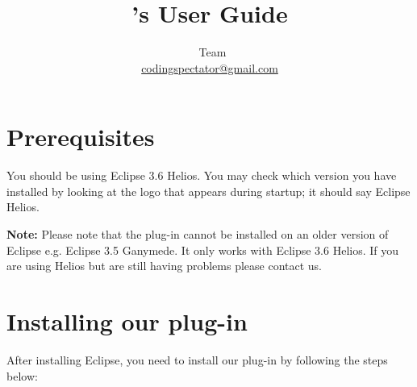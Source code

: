 \documentclass{article}
\title{\codspec's User Guide}
\author{\codspec\
Team\\\href{mailto:codingspectator@gmail.com}{codingspectator@gmail.com}}
\newcommand\warnnote[1]{\textbf{Note: }#1}
\begin{document}
%
\maketitle
%
\tableofcontents
%
\section{Prerequisites}
%
You should be using Eclipse 3.6 Helios. You may check which version you have
installed by looking at the logo that appears during startup; it should say
Eclipse Helios.

\warnnote{Please note that the plug-in cannot be installed on an older version
of Eclipse e.g. Eclipse 3.5 Ganymede. It only works with Eclipse 3.6 Helios. If
you are using Helios but are still having problems please contact us.}
%
\section{Installing our plug-in}

After installing Eclipse, you need to install our plug-in by following the steps
below:
\end{document}
